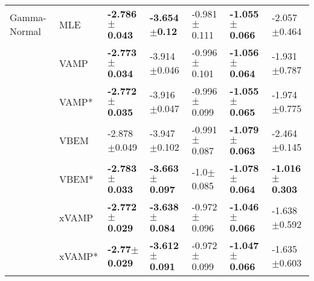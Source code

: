 \begin{tabular}{lllllll}
Gamma-Normal & MLE &  \textbf{-2.786$\pm$0.043} &   \textbf{-3.654$\pm$0.12} &          -0.981$\pm$0.111 &  \textbf{-1.055$\pm$0.066} &           -2.057$\pm$0.464 \\
             & VAMP &  \textbf{-2.773$\pm$0.034} &           -3.914$\pm$0.046 &          -0.996$\pm$0.101 &  \textbf{-1.056$\pm$0.064} &           -1.931$\pm$0.787 \\
             & VAMP* &  \textbf{-2.772$\pm$0.035} &           -3.916$\pm$0.047 &          -0.996$\pm$0.099 &  \textbf{-1.055$\pm$0.065} &           -1.974$\pm$0.775 \\
             & VBEM &           -2.878$\pm$0.049 &           -3.947$\pm$0.102 &          -0.991$\pm$0.087 &  \textbf{-1.079$\pm$0.063} &           -2.464$\pm$0.145 \\
             & VBEM* &  \textbf{-2.783$\pm$0.033} &  \textbf{-3.663$\pm$0.097} &            -1.0$\pm$0.085 &  \textbf{-1.078$\pm$0.064} &  \textbf{-1.016$\pm$0.303} \\
             & xVAMP &  \textbf{-2.772$\pm$0.029} &  \textbf{-3.638$\pm$0.084} &          -0.972$\pm$0.096 &  \textbf{-1.046$\pm$0.066} &           -1.638$\pm$0.592 \\
             & xVAMP* &   \textbf{-2.77$\pm$0.029} &  \textbf{-3.612$\pm$0.091} &          -0.972$\pm$0.099 &  \textbf{-1.047$\pm$0.066} &           -1.635$\pm$0.603 \\
\bottomrule
\end{tabular}

